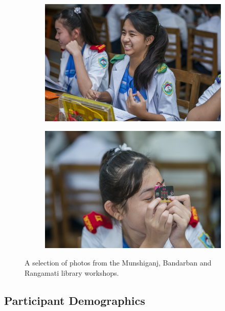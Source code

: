 \documentclass[12pt]{report} %
\begin{document}
\begin{figure}[t!]
        \begin{subfigure}[]{0.46\textwidth}
        \centering
        \includegraphics[width=1.0\textwidth]{_TM20868}
    \end{subfigure}
    \begin{subfigure}[]{0.46\textwidth}
        \centering
        \includegraphics[width=1.0\textwidth]{_TM20980}
    \end{subfigure}    
    \caption{A selection of photos from the Munshiganj, Bandarban and Rangamati library workshops.}
    \label{fig:photos}
\end{figure}

\newpage
\subsection{Participant Demographics} %
\end{document}
